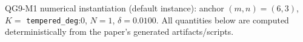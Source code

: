 \noindent\AuditTag QG9-M1 numerical instantiation (default instance): anchor $(m,n)=(6,3)$, $K=$ \texttt{tempered_deg}:0, $N=1$, $\delta=0.0100$. All quantities below are computed deterministically from the paper's generated artifacts/scripts.
